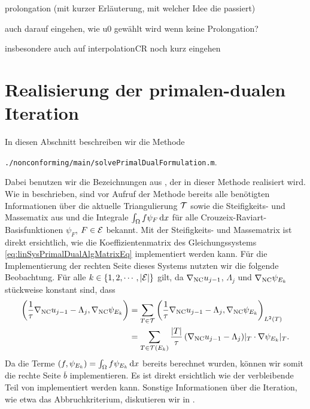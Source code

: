 \bigskip prolongation (mit kurzer Erläuterung, mit welcher Idee die passiert)

auch darauf eingehen, wie u0 gewählt wird wenn keine Prolongation?

insbesondere auch auf interpolationCR noch kurz eingehen


\section{Realisierung der primalen-dualen Iteration}
\label{sec:implementationPrimalDualIteration}
In diesen Abschnitt beschreiben wir die Methode
\begin{center}
  \texttt{./nonconforming/main/solvePrimalDualFormulation.m}.
\end{center}
Dabei benutzen wir die Bezeichnungen aus , der
in dieser Methode realisiert wird.
Wie in  beschrieben, sind vor Aufruf der Methode bereits
alle benötigten Informationen über die aktuelle Triangulierung $\mathcal{T}$
sowie die Steifig\-keits- und Massematix aus 
und die Integrale $\int_\Omega f\psi_F\,\mathrm{d}x$ für alle
Crouzeix-Raviart-Basisfunktionen $\psi_F$, $F\in\mathcal{E}$ bekannt.
Mit der Steifigkeits- und Massematrix ist direkt ersichtlich,
wie die Koeffizientenmatrix des Gleichungssystems
\eqref{eq:linSysPrimalDualAlgMatrixEq} implementiert werden kann.
Für die Implementierung der rechten Seite dieses Systems nutzten wir die
folgende Beobachtung.
Für alle $k\in\{1,2,\cdots,|\mathcal{E}|\}$ gilt, da $\nabla_\textup{NC} u_{j-1}$,
$\Lambda_j$ und $\nabla_\textup{NC} \psi_{E_k}$ stückweise konstant sind, dass
\begin{align*}
  \left(\frac{1}{\tau}\nabla_\textup{NC} u_{j-1}-\Lambda_j,\nabla_\textup{NC}\psi_{E_k}\right)
  &=
  \sum_{T\in\mathcal{T}}
  \left(\frac{1}{\tau}\nabla_\textup{NC} u_{j-1}-\Lambda_j,
  \nabla_\textup{NC}\psi_{E_k}\right)_{L^2(T)}\\
  &=
  \sum_{T\in\mathcal{T}(E_k)}
  \frac{|T|}{\tau}\left(\nabla_\textup{NC} u_{j-1}-\Lambda_j\right)\!|_T\cdot
  \nabla\psi_{E_k}|_T.
\end{align*}
Da die Terme $\left(f,\psi_{E_k}\right)=\int_\Omega f\psi_{E_k}\,\mathrm{d}x$ bereits
berechnet wurden, können wir somit die rechte Seite $\overline b$
implementieren.
Es ist direkt ersichtlich wie der verbleibende Teil von
 implementiert werden kann.
Sonstige Informationen über die Iteration, wie etwa das Abbruchkriterium,
diskutieren wir in .

